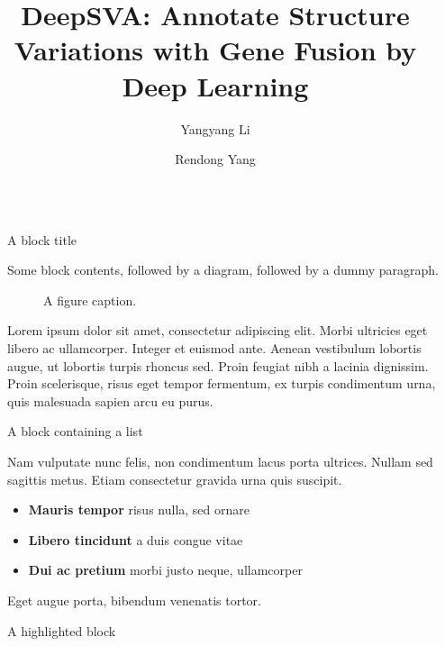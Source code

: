 \documentclass[final]{beamer}
\title{DeepSVA: Annotate Structure Variations with Gene Fusion by Deep Learning}
\author{Yangyang Li \inst{1} \and Rendong Yang \inst{1}}
\institute[shortinst]{\inst{1} Department of Urology, Northwestern University Feinberg School of Medicine \samelineand}
\newlength{\sepwidth}
\newlength{\colwidth}
\newcommand{\separatorcolumn}{\begin{column}{\sepwidth}\end{column}}
\begin{document}
\begin{frame}[t]
\begin{columns}[t]
\separatorcolumn

\begin{column}{\colwidth}

  \begin{block}{A block title}

    Some block contents, followed by a diagram, followed by a dummy paragraph.

    \begin{figure}
      \centering
      \caption{A figure caption.}
    \end{figure}

    Lorem ipsum dolor sit amet, consectetur adipiscing elit. Morbi ultricies
    eget libero ac ullamcorper. Integer et euismod ante. Aenean vestibulum
    lobortis augue, ut lobortis turpis rhoncus sed. Proin feugiat nibh a
    lacinia dignissim. Proin scelerisque, risus eget tempor fermentum, ex
    turpis condimentum urna, quis malesuada sapien arcu eu purus.

  \end{block}

  \begin{block}{A block containing a list}

    Nam vulputate nunc felis, non condimentum lacus porta ultrices. Nullam sed
    sagittis metus. Etiam consectetur gravida urna quis suscipit.

    \begin{itemize}
      \item \textbf{Mauris tempor} risus nulla, sed ornare
      \item \textbf{Libero tincidunt} a duis congue vitae
      \item \textbf{Dui ac pretium} morbi justo neque, ullamcorper
    \end{itemize}

    Eget augue porta, bibendum venenatis tortor.

  \end{block}

  \begin{alertblock}{A highlighted block}


\end{alertblock}
\end{column}
\end{columns}
\end{frame}
\end{document}
